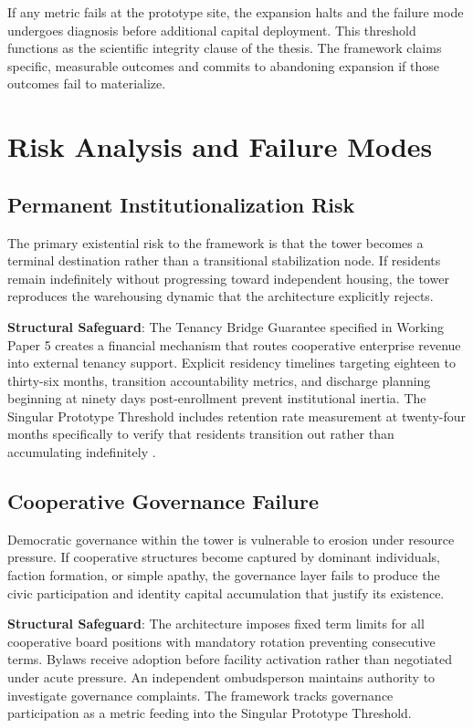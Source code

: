 \documentclass[12pt, letterpaper]{article}
\begin{document}
If any metric fails at the prototype site, the expansion halts and the failure mode undergoes diagnosis before additional capital deployment. This threshold functions as the scientific integrity clause of the thesis. The framework claims specific, measurable outcomes and commits to abandoning expansion if those outcomes fail to materialize.

\newpage
\section{Risk Analysis and Failure Modes}

\subsection{Permanent Institutionalization Risk}

The primary existential risk to the framework is that the tower becomes a terminal destination rather than a transitional stabilization node. If residents remain indefinitely without progressing toward independent housing, the tower reproduces the warehousing dynamic that the architecture explicitly rejects.

\textbf{Structural Safeguard}: The Tenancy Bridge Guarantee specified in Working Paper 5 creates a financial mechanism that routes cooperative enterprise revenue into external tenancy support. Explicit residency timelines targeting eighteen to thirty-six months, transition accountability metrics, and discharge planning beginning at ninety days post-enrollment prevent institutional inertia. The Singular Prototype Threshold includes retention rate measurement at twenty-four months specifically to verify that residents transition out rather than accumulating indefinitely \citep{dibella_2026_wp5}.

\subsection{Cooperative Governance Failure}

Democratic governance within the tower is vulnerable to erosion under resource pressure. If cooperative structures become captured by dominant individuals, faction formation, or simple apathy, the governance layer fails to produce the civic participation and identity capital accumulation that justify its existence.

\textbf{Structural Safeguard}: The architecture imposes fixed term limits for all cooperative board positions with mandatory rotation preventing consecutive terms. Bylaws receive adoption before facility activation rather than negotiated under acute pressure. An independent ombudsperson maintains authority to investigate governance complaints. The framework tracks governance participation as a metric feeding into the Singular Prototype Threshold.
\end{document}
